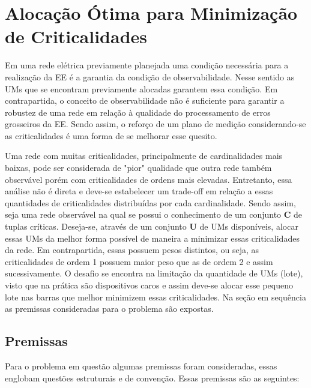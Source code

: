 \documentclass[12pt]{article}
\begin{document}
\section{Alocação Ótima para Minimização de Criticalidades}

Em uma rede elétrica previamente planejada uma condição necessária para a realização da EE é a garantia da condição de observabilidade. Nesse sentido as UMs que se encontram previamente alocadas garantem essa condição. Em contrapartida, o conceito de observabilidade não é suficiente para garantir a robustez de uma rede em relação à qualidade do processamento de erros grosseiros da EE. Sendo assim, o reforço de um plano de medição considerando-se as criticalidades é uma forma de se melhorar esse quesito.

Uma rede com muitas criticalidades, principalmente de cardinalidades mais baixas, pode ser considerada de "pior" qualidade que outra rede também observável porém com criticalidades de ordens mais elevadas. Entretanto, essa análise não é direta e deve-se estabelecer um trade-off em relação a essas quantidades de criticalidades distribuídas por cada cardinalidade. Sendo assim, seja uma rede observável na qual se possui o conhecimento de um conjunto $\mathbf{C}$ de tuplas críticas. Deseja-se, através de um conjunto $\mathbf{U}$ de UMs disponíveis, alocar essas UMs da melhor forma possível de maneira a minimizar essas criticalidades da rede. Em contrapartida, essas possuem pesos distintos, ou seja, as criticalidades de ordem 1 possuem maior peso que as de ordem 2 e assim sucessivamente. O desafio se encontra na limitação da quantidade de UMs (lote), visto que na prática são dispositivos caros e assim deve-se alocar esse pequeno lote nas barras que melhor minimizem essas criticalidades. Na seção em sequência as premissas consideradas para o problema são expostas.


\subsection{Premissas}

Para o problema em questão algumas premissas foram consideradas, essas englobam questões estruturais e de convenção. Essas premissas são as seguintes:
\end{document}

